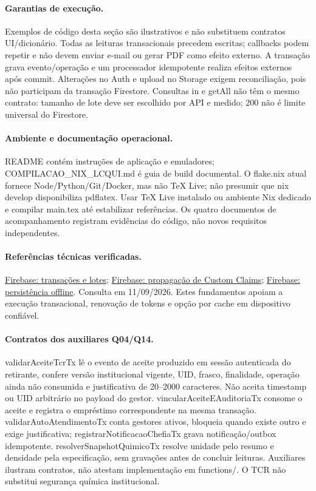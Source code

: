 \paragraph{Garantias de execução.}
Exemplos de código desta seção são ilustrativos e não substituem contratos UI/dicionário. Todas as leituras transacionais precedem escritas; callbacks podem repetir e não devem enviar e-mail ou gerar PDF como efeito externo. A transação grava evento/operação e um processador idempotente realiza efeitos externos após commit. Alterações no Auth e upload no Storage exigem reconciliação, pois não participam da transação Firestore. Consultas in e getAll não têm o mesmo contrato: tamanho de lote deve ser escolhido por API e medido; 200 não é limite universal do Firestore.

\paragraph{Ambiente e documentação operacional.}
README contém instruções de aplicação e emuladores; COMPILACAO\_NIX\_LCQUI.md é guia de build documental. O flake.nix atual fornece Node/Python/Git/Docker, mas não TeX Live; não presumir que nix develop disponibiliza pdflatex. Usar TeX Live instalado ou ambiente Nix dedicado e compilar main.tex até estabilizar referências. Os quatro documentos de acompanhamento registram evidências do código, não novos requisitos independentes.

\paragraph{Referências técnicas verificadas.}
\href{https://firebase.google.com/docs/firestore/manage-data/transactions}{Firebase: transações e lotes};
\href{https://firebase.google.com/docs/auth/admin/custom-claims}{Firebase: propagação de Custom Claims};
\href{https://firebase.google.com/docs/firestore/manage-data/enable-offline}{Firebase: persistência offline}.
Consulta em 11/09/2026. Estes fundamentos apoiam a execução transacional, renovação de tokens e opção por cache em dispositivo confiável.

\paragraph{Contratos dos auxiliares Q04/Q14.}
validarAceiteTcrTx lê o evento de aceite produzido em sessão autenticada do retirante, confere versão institucional vigente, UID, frasco, finalidade, operação ainda não consumida e justificativa de 20--2000 caracteres. Não aceita timestamp ou UID arbitrário no payload do gestor. vincularAceiteEAuditoriaTx consome o aceite e registra o empréstimo correspondente na mesma transação. validarAutoAtendimentoTx conta gestores ativos, bloqueia quando existe outro e exige justificativa; registrarNotificacaoChefiaTx grava notificação/outbox idempotente. resolverSnapshotQuimicoTx resolve unidade pelo resumo e densidade pela especificação, sem gravações antes de concluir leituras. Auxiliares ilustram contratos, não atestam implementação em functions/. O TCR não substitui segurança química institucional.

